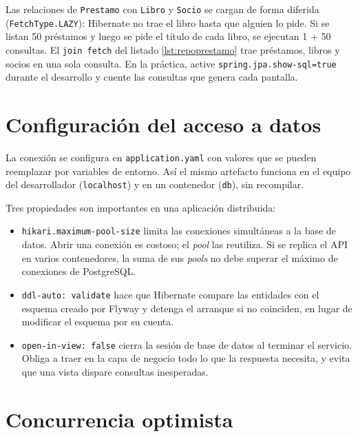 \begin{avisoBox}[title={El problema de las N+1 consultas}]
	Las relaciones de \texttt{Prestamo} con \texttt{Libro} y \texttt{Socio} se cargan de forma diferida (\texttt{FetchType.LAZY}): Hibernate no trae el libro hasta que alguien lo pide. Si se listan 50 préstamos y luego se pide el título de cada libro, se ejecutan 1 + 50 consultas. El \texttt{join fetch} del listado \ref{lst:repoprestamo} trae préstamos, libros y socios en una sola consulta. En la práctica, active \texttt{spring.jpa.show-sql=true} durante el desarrollo y cuente las consultas que genera cada pantalla.
\end{avisoBox}

\section{Configuración del acceso a datos}

La conexión se configura en \texttt{application.yaml} con valores que se pueden reemplazar por variables de entorno. Así el mismo artefacto funciona en el equipo del desarrollador (\texttt{localhost}) y en un contenedor (\texttt{db}), sin recompilar.



Tres propiedades son importantes en una aplicación distribuida:

\begin{itemize}
	\item \texttt{hikari.maximum-pool-size} limita las conexiones simultáneas a la base de datos. Abrir una conexión es costoso; el \emph{pool} las reutiliza. Si se replica el API en varios contenedores, la suma de sus \emph{pools} no debe superar el máximo de conexiones de PostgreSQL.
	\item \texttt{ddl-auto: validate} hace que Hibernate compare las entidades con el esquema creado por Flyway y detenga el arranque si no coinciden, en lugar de modificar el esquema por su cuenta.
	\item \texttt{open-in-view: false} cierra la sesión de base de datos al terminar el servicio. Obliga a traer en la capa de negocio todo lo que la respuesta necesita, y evita que una vista dispare consultas inesperadas.
\end{itemize}

\section{Concurrencia optimista}\label{sec:optimista}

